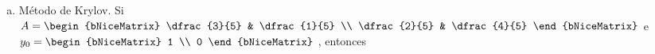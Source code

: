 \begin{frame}
	\begin{solution}
		\begin{enumerate}[c)]
			\item

			      \alert{Método de Krylov.} Si
			      \begin{math}
				      A=\begin{bNiceMatrix}
					      \dfrac{3}{5} & \dfrac{1}{5} \\
					      \dfrac{2}{5} & \dfrac{4}{5}
				      \end{bNiceMatrix}
			      \end{math} e
			      \begin{math}
				      y_{0}=
				      \begin{bNiceMatrix}
					      1 \\
					      0
				      \end{bNiceMatrix}
			      \end{math}
			      , entonces


\end{enumerate}
\end{solution}
\end{frame}
